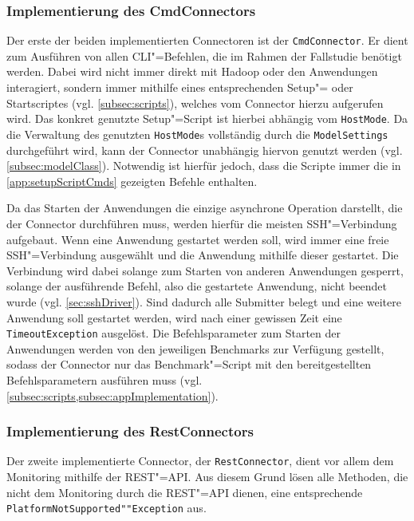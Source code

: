 \subsubsection{Implementierung des CmdConnectors}
\label{subsubsec:implCmdConnector}

Der erste der beiden implementierten Connectoren ist der \texttt{CmdConnector}.
Er dient zum Ausführen von allen CLI"=Befehlen, die im Rahmen der Fallstudie benötigt werden.
Dabei wird nicht immer direkt mit Hadoop oder den Anwendungen interagiert, sondern immer mithilfe eines entsprechenden Setup"= oder Startscriptes (vgl. \cref{subsec:scripts}), welches vom Connector hierzu aufgerufen wird.
Das konkret genutzte Setup"=Script ist hierbei abhängig vom \texttt{HostMode}.
Da die Verwaltung des genutzten \texttt{HostMode}s vollständig durch die \texttt{ModelSettings} durchgeführt wird, kann der Connector unabhängig hiervon genutzt werden (vgl. \cref{subsec:modelClass}).
Notwendig ist hierfür jedoch, dass die Scripte immer die in \cref{app:setupScriptCmds} gezeigten Befehle enthalten.

Da das Starten der Anwendungen die einzige asynchrone Operation darstellt, die der Connector durchführen muss, werden hierfür die meisten SSH"=Verbindung aufgebaut.
Wenn eine Anwendung gestartet werden soll, wird immer eine freie SSH"=Verbindung ausgewählt und die Anwendung mithilfe dieser gestartet.
Die Verbindung wird dabei solange zum Starten von anderen Anwendungen gesperrt, solange der ausführende Befehl, also die gestartete Anwendung, nicht beendet wurde (vgl. \cref{sec:sshDriver}).
Sind dadurch alle Submitter belegt und eine weitere Anwendung soll gestartet werden, wird nach einer gewissen Zeit eine \texttt{TimeoutException} ausgelöst.
Die Befehlsparameter zum Starten der Anwendungen werden von den jeweiligen Benchmarks zur Verfügung gestellt, sodass der Connector nur das Benchmark"=Script mit den bereitgestellten Befehlsparametern ausführen muss (vgl. \cref{subsec:scripts,subsec:appImplementation}).

\subsubsection{Implementierung des RestConnectors}
\label{subsubsec:implRestConnector}

Der zweite implementierte Connector, der \texttt{RestConnector}, dient vor allem dem Monitoring mithilfe der REST"=API.
Aus diesem Grund lösen alle Methoden, die nicht dem Monitoring durch die REST"=API dienen, eine entsprechende \texttt{PlatformNotSupported""Exception} aus.

